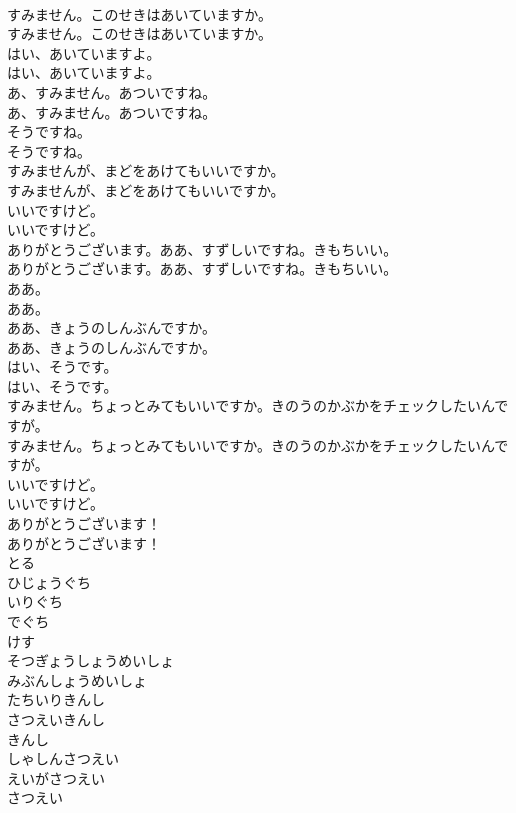 \documentclass[8pt]{extreport}
\begin{document}
\begin{CJK}{UTF8}{min}
\\	すみません。このせきはあいていますか。	
\\	すみません。このせきはあいていますか。 
\\	はい、あいていますよ。	
\\	はい、あいていますよ。 
\\	あ、すみません。あついですね。	
\\	あ、すみません。あついですね。 
\\	そうですね。	
\\	そうですね。 
\\	すみませんが、まどをあけてもいいですか。	
\\	すみませんが、まどをあけてもいいですか。 
\\	いいですけど。	
\\	いいですけど。 
\\	ありがとうございます。ああ、すずしいですね。きもちいい。	
\\	ありがとうございます。ああ、すずしいですね。きもちいい。 
\\	ああ。	
\\	ああ。 
\\	ああ、きょうのしんぶんですか。	
\\	ああ、きょうのしんぶんですか。 
\\	はい、そうです。	
\\	はい、そうです。 
\\	すみません。ちょっとみてもいいですか。きのうのかぶかをチェックしたいんですが。	
\\	すみません。ちょっとみてもいいですか。きのうのかぶかをチェックしたいんですが。 
\\	いいですけど。	
\\	いいですけど。 
\\	ありがとうございます！	
\\	ありがとうございます！ 
\\	とる
\\	ひじょうぐち
\\	いりぐち
\\	でぐち
\\	けす
\\	そつぎょうしょうめいしょ
\\	みぶんしょうめいしょ
\\	たちいりきんし
\\	さつえいきんし
\\	きんし
\\	しゃしんさつえい
\\	えいがさつえい
\\	さつえい

\end{CJK}
\end{document}
